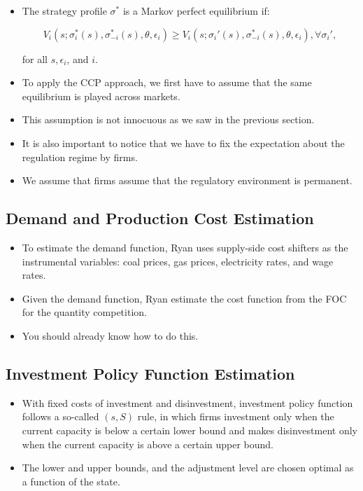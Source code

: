 \documentclass[]{book}
\providecommand{\tightlist}{%
  \setlength{\itemsep}{0pt}\setlength{\parskip}{0pt}}
\begin{document}
\begin{itemize}
\tightlist
\item
  The strategy profile \(\sigma^*\) is a Markov perfect equilibrium if:

  \begin{equation}
  V_i(s; \sigma_i^*(s), \sigma_{-i}^*(s), \theta, \epsilon_i) \ge V_i(s; \sigma_i'(s), \sigma_{-i}^*(s), \theta, \epsilon_i), \forall \sigma_i',
  \end{equation}

  for all \(s, \epsilon_i\), and \(i\).
\item
  To apply the CCP approach, we first have to assume that the same
  equilibrium is played across markets.
\item
  This assumption is not innocuous as we saw in the previous section.
\item
  It is also important to notice that we have to fix the expectation
  about the regulation regime by firms.
\item
  We assume that firms assume that the regulatory environment is
  permanent.
\end{itemize}

\subsection{Demand and Production Cost
Estimation}\label{demand-and-production-cost-estimation}

\begin{itemize}
\tightlist
\item
  To estimate the demand function, Ryan uses supply-side cost shifters
  as the instrumental variables: coal prices, gas prices, electricity
  rates, and wage rates.
\item
  Given the demand function, Ryan estimate the cost function from the
  FOC for the quantity competition.
\item
  You should already know how to do this.
\end{itemize}

\subsection{Investment Policy Function
Estimation}\label{investment-policy-function-estimation}

\begin{itemize}
\tightlist
\item
  With fixed costs of investment and disinvestment, investment policy
  function follows a so-called \((s, S)\) rule, in which firms
  investment only when the current capacity is below a certain lower
  bound and makes disinvestment only when the current capacity is above
  a certain upper bound.
\item
  The lower and upper bounds, and the adjustment level are chosen
  optimal as a function of the state.
\end{itemize}
\end{document}
